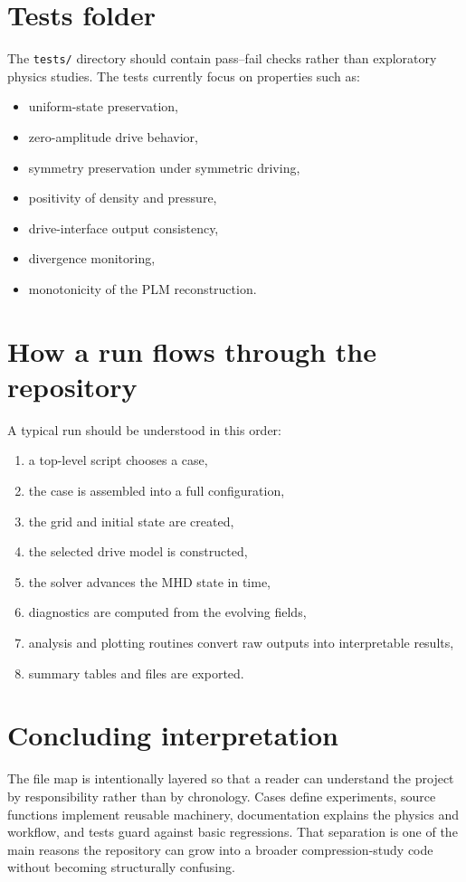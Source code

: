 \documentclass[11pt]{article}
\begin{document}
\section{Tests folder}
The \texttt{tests/} directory should contain pass--fail checks rather than exploratory physics studies. The tests currently focus on properties such as:
\begin{itemize}[leftmargin=1.8em]
    \item uniform-state preservation,
    \item zero-amplitude drive behavior,
    \item symmetry preservation under symmetric driving,
    \item positivity of density and pressure,
    \item drive-interface output consistency,
    \item divergence monitoring,
    \item monotonicity of the PLM reconstruction.
\end{itemize}

\section{How a run flows through the repository}
A typical run should be understood in this order:
\begin{enumerate}[leftmargin=1.8em]
    \item a top-level script chooses a case,
    \item the case is assembled into a full configuration,
    \item the grid and initial state are created,
    \item the selected drive model is constructed,
    \item the solver advances the MHD state in time,
    \item diagnostics are computed from the evolving fields,
    \item analysis and plotting routines convert raw outputs into interpretable results,
    \item summary tables and files are exported.
\end{enumerate}

\section{Concluding interpretation}
The file map is intentionally layered so that a reader can understand the project by responsibility rather than by chronology. Cases define experiments, source functions implement reusable machinery, documentation explains the physics and workflow, and tests guard against basic regressions. That separation is one of the main reasons the repository can grow into a broader compression-study code without becoming structurally confusing.
\end{document}
